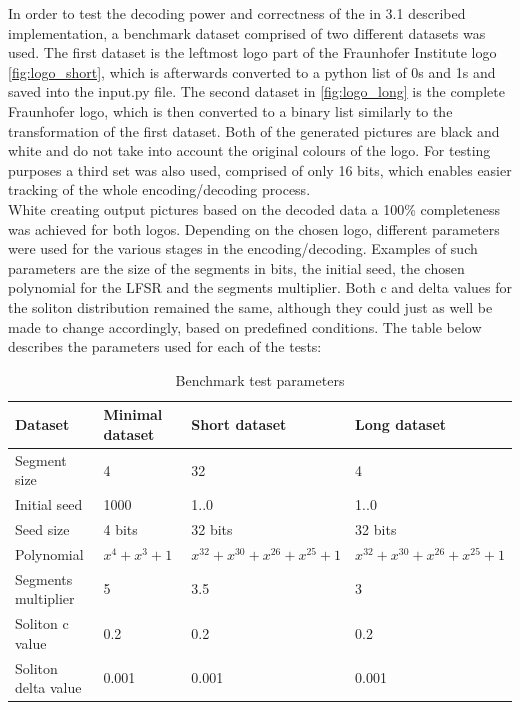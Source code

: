\documentclass[12pt]%
{article}
\begin{document}
In order to test the decoding power and correctness of the in 3.1 described implementation, a benchmark dataset comprised of two different datasets was used. The first dataset is the leftmost logo part of the Fraunhofer Institute logo \ref{fig:logo_short}, which is afterwards converted to a python list of 0s and 1s and saved into the input.py file. The second dataset in \ref{fig:logo_long} is the complete Fraunhofer logo, which is then converted to a binary list similarly to the transformation of the first dataset. Both of the generated pictures are black and white and do not take into account the original colours of the logo. For testing purposes a third set was also used, comprised of only 16 bits, which enables easier tracking of the whole encoding/decoding process.  \\
White creating output pictures based on the decoded data a 100\% completeness was achieved for both logos. Depending on the chosen logo, different parameters were used for the various stages in the encoding/decoding. Examples of such parameters are the size of the segments in bits, the initial seed, the chosen polynomial for the LFSR and the segments multiplier. Both c and delta values for the soliton distribution remained the same, although they could just as well be made to change accordingly, based on predefined conditions. The table below describes the parameters used for each of the tests: \\


\begin{table}[h!]
    \centering
    \small
    \begin{tabularx}{\textwidth}{|X|X|X|X|}
        \hline
        Dataset & Minimal dataset & Short dataset & Long dataset \\
        \hline
        Segment size & 4 & 32 & 4 \\
        \hline
        Initial seed & 1000 & 1..0 & 1..0 \\
        \hline
        Seed size & 4 bits & 32 bits & 32 bits \\
        \hline
        Polynomial & \(x^{4} + x^{3} + 1 \) & \(x^{32} + x^{30} + x^{26} + x^{25} + 1\) & \(x^{32} + x^{30} + x^{26} + x^{25} + 1\) \\
        \hline
        Segments multiplier & 5 & 3.5 & 3 \\
        \hline
        Soliton c value & 0.2 & 0.2 & 0.2 \\
        \hline
        Soliton delta value & 0.001 & 0.001 & 0.001 \\
        \hline
    \end{tabularx}
    \caption{Benchmark test parameters}
    \label{tab:benchmark-parameters}
\end{table}
\end{document}
